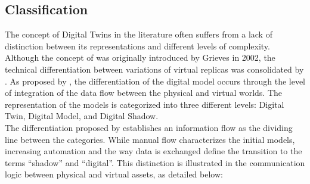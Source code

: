 \subsection{Classification}

The concept of Digital Twins in the literature often suffers from a lack of distinction between its representations and
different levels of complexity. Although the concept of \DTs was originally introduced by Grieves in 2002, the technical
differentiation between variations of virtual replicas was consolidated by . 
As proposed by , the differentiation of the digital model occurs through the level of integration of the
data flow between the physical and virtual worlds. The representation of the models is categorized into three different levels:
Digital Twin, Digital Model, and Digital Shadow.\\
The differentiation proposed by  establishes an information flow as the dividing line between the
categories. While manual flow characterizes the initial models, increasing automation and the way data is exchanged define the
transition to the terms ``shadow'' and ``digital''. This distinction is illustrated in the communication logic between physical and
virtual assets, as detailed below:

